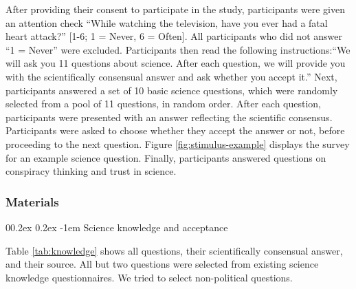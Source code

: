 \documentclass[
  doc,floatsintext]{apa6}
\makeatletter
\let\oldparagraph\paragraph
\renewcommand{\paragraph}[1]{\oldparagraph{#1}\mbox{}}
\renewcommand{\paragraph}{\@startsection{paragraph}{4}{\parindent}%
  {0\baselineskip \@plus 0.2ex \@minus 0.2ex}%
  {-1em}%
  {\normalfont\normalsize\bfseries\itshape\typesectitle}}
\makeatother
\begin{document}
After providing their consent to participate in the study, participants were given an attention check ``While watching the television, have you ever had a fatal heart attack?'' {[}1-6; 1 = Never, 6 = Often{]}. All participants who did not answer ``1 = Never'' were excluded. Participants then read the following instructions:``We will ask you 11 questions about science. After each question, we will provide you with the scientifically consensual answer and ask whether you accept it.'' Next, participants answered a set of 10 basic science questions, which were randomly selected from a pool of 11 questions, in random order. After each question, participants were presented with an answer reflecting the scientific consensus. Participants were asked to choose whether they accept the answer or not, before proceeding to the next question. Figure \ref{fig:stimulus-example} displays the survey for an example science question. Finally, participants answered questions on conspiracy thinking and trust in science.

\subsubsection{Materials}\label{materials}

\paragraph{Science knowledge and acceptance}\label{science-knowledge-and-acceptance}

Table \ref{tab:knowledge} shows all questions, their scientifically consensual answer, and their source. All but two questions were selected from existing science knowledge questionnaires. We tried to select non-political questions.

\begingroup\fontsize{8}{10}\selectfont
\end{document}
